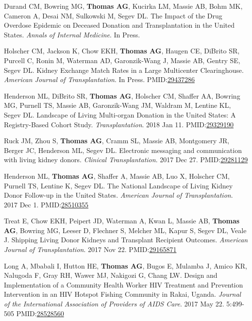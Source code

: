 \documentclass[10pt]{article}
\newcommand{\pmid}[1]{PMID:\href{https://www.ncbi.nlm.nih.gov/pubmed/#1}{#1}}
\begin{document}
\begin{bibenum}

\item Durand CM\dag, Bowring MG\dag, \textbf{Thomas AG}, Kucirka LM,
  Massie AB, Bohm MK, Cameron A, Desai NM, Sulkowski M, Segev DL.
  The Impact of the Drug Overdose Epidemic on Deceased Donation
  and Transplantation in the United States.
  \emph{Annals of Internal Medicine}. In Press.

\item Holscher CM, Jackson K, Chow EKH, \textbf{Thomas AG}, Haugen CE,
  DiBrito SR, Purcell C, Ronin M, Waterman AD, Garonzik-Wang J, Massie AB,
  Gentry SE, Segev DL. Kidney Exchange Match Rates in a Large
  Multicenter Clearinghouse.
  \emph{American Journal of Transplantation}. In Press.
  \pmid{29437286} 

\item Henderson ML\dag, DiBrito SR\dag, \textbf{Thomas AG}, Holscher CM,
  Shaffer AA, Bowring MG, Purnell TS, Massie AB, Garonzik-Wang JM,
  Waldram M, Lentine KL, Segev DL.  Landscape of Living Multi-organ
  Donation in the United States: A Registry-Based Cohort Study.
  \emph{Transplantation}. 2018 Jan 11.
  \pmid{29329190} 

\item Ruck JM, Zhou S, \textbf{Thomas AG}, Cramm SL, Massie AB,
  Montgomery JR, Berger JC, Henderson ML, Segev DL.
  Electronic messaging and communication with living kidney donors.
  \emph{Clinical Transplantation}. 2017 Dec 27.
  \pmid{29281129} 

\item Henderson ML\dag, \textbf{Thomas AG\dag}, Shaffer A, Massie AB, Luo X,
  Holscher CM, Purnell TS, Lentine K, Segev DL. The National Landscape
  of Living Kidney Donor Follow-up in the United States.
  \emph{American Journal of Transplantation}. 2017 Dec 1.
  \pmid{28510355} 

\item Treat E, Chow EKH, Peipert JD, Waterman A, Kwan L, Massie AB,
  \textbf{Thomas AG}, Bowring MG, Leeser D, Flechner S, Melcher ML, Kapur S,
  Segev DL, Veale J. Shipping Living Donor Kidneys and Transplant Recipient
  Outcomes.
  \emph{American Journal of Transplantation}. 2017 Nov 22.
  \pmid{29165871} 

\item Long A, Mbabali I, Hutton HE, \textbf{Thomas AG}, Bugos E,
  Mulamba J, Amico KR, Nalugoda F, Gray RH,
  Wawer MJ, Nakigozi G, Chang LW.
  Design and Implementation of a Community Health Worker HIV
  Treatment and Prevention Intervention in an HIV Hotspot
  Fishing Community in Rakai, Uganda. \emph{Journal of the International
  Association of Providers of AIDS Care}. 2017 May 22. 5:499-505
  \pmid{28528560} \\ 


\end{bibenum}
\end{document}
